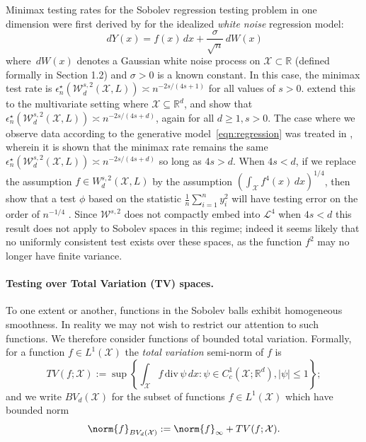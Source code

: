 \documentclass{article}
\newcommand{\Reals}{\mathbb{R}}
\newcommand{\abs}[1]{\left \lvert #1 \right \rvert}
\newcommand{\1}{\mathbf{1}}
\newcommand{\dive}{\mathrm{div}}
\theoremstyle{alden}
\theoremstyle{aldenthm}
\theoremstyle{definition}
\theoremstyle{remark}
\begin{document}
Minimax testing rates for the Sobolev regression testing problem in one dimension were first derived by \citet{ingster82} for the idealized \emph{white noise} regression model:
\begin{equation}
\label{eqn:gaussian_white_noise}
\,dY(x) = f(x) \,dx + \frac{\sigma}{\sqrt{n}}\,dW(x)
\end{equation}
where $\,dW(x)$ denotes a Gaussian white noise process on $\mathcal{X} \subset \Reals$ (defined formally in \citet{gine16} Section 1.2) and $\sigma > 0$ is a known constant. In this case, the minimax test rate is $\epsilon_n^{\star}(\mathcal{W}_d^{s,2}(\mathcal{X}, L)) \asymp n^{-2s/(4s + 1)}$ for all values of $s > 0$. \citet{ingster05} extend this to the multivariate setting where $\mathcal{X} \subseteq \Reals^d$, and show that $\epsilon_n^{\star}(\mathcal{W}_d^{s,2}(\mathcal{X}, L)) \asymp n^{-2s/(4s + d)}$, again for all $d \geq 1, s > 0$. The case where we observe data according to the generative model~\eqref{eqn:regression} was treated in \cite{ingster09}, wherein it is shown that the minimax rate remains the same  $\epsilon_n^{\star}(\mathcal{W}_d^{s,2}(\mathcal{X}, L)) \asymp n^{-2s/(4s + d)}$ so long as $4s > d$. When $4s < d$, if we replace the assumption $f \in W_d^{s,2}(\mathcal{X},L)$ by the assumption $\left(\int_{\mathcal{X}} f^4(x) \,dx\right)^{1/4}$, then \citet{guerre02} show that a test $\phi$ based on the statistic $\frac{1}{n}\sum_{i = 1}^{n}y_i^2$ will have testing error on the order of $n^{-1/4}$ . Since $\mathcal{W}^{s,2}$ does not compactly embed into $\mathcal{L}^4$ when $4s < d$ this result does not apply to Sobolev spaces in this regime; indeed it seems likely that no uniformly consistent test exists over these spaces, as the function $f^2$ may no longer have finite variance.

\paragraph{Testing over Total Variation (TV) spaces.}

To one extent or another, functions in the Sobolev balls exhibit homogeneous smoothness. In reality we may not wish to restrict our attention to such functions. We therefore consider functions of bounded total variation. Formally, for a function $f \in L^1(\mathcal{X})$ the \emph{total variation} semi-norm of $f$ is \citet{evans15}
\begin{equation*}
TV(f;\mathcal{X}) := \sup \left\{ \int_{\mathcal{X}} f \, \dive \, \psi \,dx : \psi \in C_c^1(\mathcal{X}; \Reals^d), \abs{\psi} \leq 1 \right\};
\end{equation*}
and we write $BV_d(\mathcal{X})$ for the subset of functions $f \in L^1(\mathcal{X})$ which have bounded norm
\begin{equation*}
\norm{f}_{BV_d(\mathcal{X})} := \norm{f}_{\infty} + TV(f;\mathcal{X}).
\end{equation*}
\end{document}
